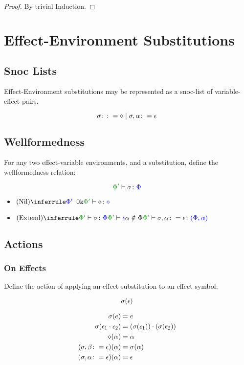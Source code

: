 \documentclass{report}
\begin{document}
        \begin{proof}
            By trivial Induction.
        \end{proof}

\section{Effect-Environment Substitutions}
    \subsection{Snoc Lists}
        Effect-Environment substitutions may be represented as a snoc-list of variable-effect pairs.

        \[
            \sigma \colon\colon= \diamond \mid \sigma, \alpha \colon= \epsilon
        \]

    
    \subsection{Wellformedness}    
        For any two effect-variable environments, and a substitution, define the wellformedness relation:

        \begin{equation}
            \typerelation{\P'}{\si}{\P}
        \end{equation}

        \begin{itemize}
            \item $\ntreeruleI{Nil}{\ok{\P'}}{\typerelation{\P'}{\nil}{\nil}}$
            \item $\ntreeruleIII{Extend}{\typerelation{\P'}{\si}{\P}}{\wellformed{\P'}{\e}}{\a\notin\P}{\typerelation{\P'}{\si, \a \setto\e}{(\P, \a)}}$
        \end{itemize}

    \subsection{Actions}
        \subsubsection{On Effects}
            Define the action of applying an effect substitution to an effect symbol:

            \begin{equation}
               \sigma(\epsilon)
            \end{equation}

            \begin{align*}
                \sigma(e) & = e \\
                \sigma(\epsilon_1\cdot\epsilon_2) & = (\sigma(\epsilon_1))\cdot(\sigma(\epsilon_2))\\
                \diamond(\alpha) & = \alpha\\
                (\sigma, \beta\colon= \epsilon)(\alpha) & = \sigma(\alpha) \\
                (\sigma, \alpha\colon= \epsilon)(\alpha) & =\epsilon
            \end{align*}
\end{document}
